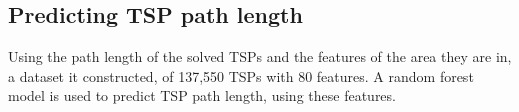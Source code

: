 \subsection{Predicting TSP path length}
Using the path length of the solved TSPs and the features of the area they are in, a dataset it constructed, of 137,550 TSPs with 80 features. A random forest model
is used to predict TSP path length, using these features.
